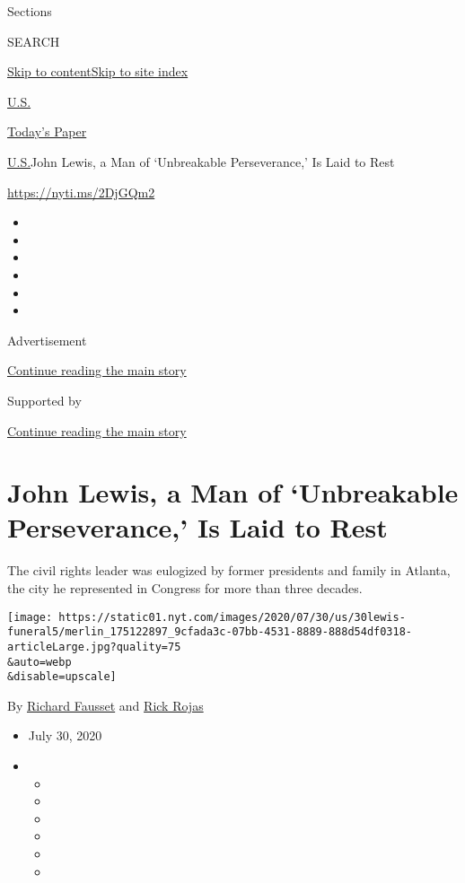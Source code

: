 Sections

SEARCH

\protect\hyperlink{site-content}{Skip to
content}\protect\hyperlink{site-index}{Skip to site index}

\href{https://www.nytimes.com/section/us}{U.S.}

\href{https://myaccount.nytimes.com/auth/login?response_type=cookie\&client_id=vi}{}

\href{https://www.nytimes.com/section/todayspaper}{Today's Paper}

\href{/section/us}{U.S.}\textbar{}John Lewis, a Man of `Unbreakable
Perseverance,' Is Laid to Rest

\url{https://nyti.ms/2DjGQm2}

\begin{itemize}
\item
\item
\item
\item
\item
\item
\end{itemize}

Advertisement

\protect\hyperlink{after-top}{Continue reading the main story}

Supported by

\protect\hyperlink{after-sponsor}{Continue reading the main story}

\hypertarget{john-lewis-a-man-of-unbreakable-perseverance-is-laid-to-rest}{%
\section{John Lewis, a Man of `Unbreakable Perseverance,' Is Laid to
Rest}\label{john-lewis-a-man-of-unbreakable-perseverance-is-laid-to-rest}}

The civil rights leader was eulogized by former presidents and family in
Atlanta, the city he represented in Congress for more than three
decades.

\texttt{[image: https://static01.nyt.com/images/2020/07/30/us/30lewis-funeral5/merlin\_175122897\_9cfada3c-07bb-4531-8889-888d54df0318-articleLarge.jpg?quality=75\\\&auto=webp\\\&disable=upscale]}

By \href{https://www.nytimes.com/by/richard-fausset}{Richard Fausset}
and \href{https://www.nytimes.com/by/rick-rojas}{Rick Rojas}

\begin{itemize}
\item
  July 30, 2020
\item
  \begin{itemize}
  \item
  \item
  \item
  \item
  \item
  \item
  \end{itemize}
\end{itemize}

